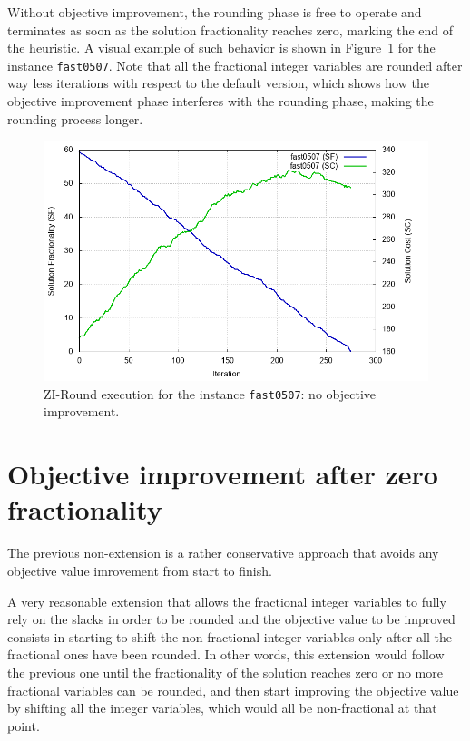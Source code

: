 \documentclass[a4paper,12pt]{book}
\begin{document}
Without objective improvement, the rounding phase is free to operate and terminates as soon as the solution fractionality reaches zero, marking the end of the heuristic. A visual example of such behavior is shown in Figure~\ref{fig:exzi-noobjimprove} for the instance \texttt{fast0507}. Note that all the fractional integer variables are rounded after way less iterations with respect to the default version, which shows how the objective improvement phase interferes with the rounding phase, making the rounding process longer.
\begin{figure}[ht]
	\centering
	\includegraphics[width=\textwidth]{fast0507-noshiftnonfrac.png}
	\caption{ZI-Round execution for the instance \texttt{fast0507}: no objective improvement.}
	\label{fig:exzi-noobjimprove}
\end{figure}

\section{Objective improvement after zero fractionality}
The previous non-extension is a rather conservative approach that avoids any objective value imrovement from start to finish. \par 

A very reasonable extension that allows the fractional integer variables to fully rely on the slacks in order to be rounded and the objective value to be improved consists in starting to shift the non-fractional integer variables only after all the fractional ones have been rounded. In other words, this extension would follow the previous one until the fractionality of the solution reaches zero or no more fractional variables can be rounded, and then start improving the objective value by shifting all the integer variables, which would all be non-fractional at that point. \par
\end{document}
